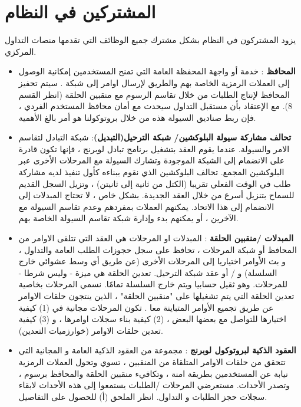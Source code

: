 \documentclass[12pt, a4paper, leqno]{report}
\theoremstyle{plain}
\theoremstyle{definition}
\begin{document}
\chapter{المشتركين في النظام}
\begin{multicols}{2}
\begin{otherlanguage}{arabic}
يزود المشتركون في النظام بشكل مشترك جميع الوظائف التي تقدمها منصات التداول  المركزي.

\begin{itemize}
  \item \textbf{المحافظ} : خدمة أو واجهة  المحفظة العامة التي تمنح المستخدمين إمكانية الوصول إلى العملات الرمزية الخاصة بهم والطريق لإرسال اوامر إلى شبكة  . سيتم تحفيز المحافظ لإنتاج الطلبات من خلال تقاسم الرسوم مع منقبين الحلقة (انظر القسم 8). مع الإعتقاد بأن مستقبل التداول سيحدث مع أمان محافظ المستخدم الفردي ، فإن ربط صناديق السيولة هذه من خلال بروتوكولنا هو أمر بالغ الأهمية.
  
  \item \textbf{تحالف مشاركة سيولة البلوكشين/ شبكة الترحيل(التبديل)}: شبكة التبادل لتقاسم الامر والسيولة. عندما يقوم العقد بتشغيل برنامج تبادل لوبرنج ، فإنها تكون قادرة على الانضمام إلى الشبكة الموجودة وتشارك السيولة مع المرحلات الأخرى عبر البلوكشين المجمع. تحالف البلوكشين الذي نقوم ببناءه كأول تنفيذ لديه مشاركة طلب في الوقت الفعلي تقريبا (الكتل من ثانية إلى ثانيتن) ، وتزيل السجل القديم للسماح بتنزيل أسرع من خلال العقد الجديدة. بشكل خاص ، لا تحتاج المبدلات إلى الانضمام إلى هذا الاتحاد. يمكنهم العملات بمفردهم وعدم تقاسم السيولة مع الآخرين ، أو يمكنهم بدء وإدارة شبكة تقاسم السيولة الخاصة بهم.
  
  \item \textbf{المبدلات /منقبين الحلقة } : المبدلات او المرحلات هي العقد التي تتلقى الاوامر من المحافظ أو شبكة المرحلات ، تحافظ على سجل حجوزات الطلب العامة والتداول ، و بث الأوامر اختياريا إلى المرحلات الأخرى (عن طريق أي وسط عشوائي خارج السلسلة) و / أو عقد شبكة الترحيل. تعدين الحلقة هي ميزة - وليس شرطا -  للمرحلات. وهو ثقيل حسابيا ويتم خارج السلسلة تمامًا. نسمي المرحلات بخاصية تعدين الحلقة التي يتم تشغيلها على "منقبين الحلقة" ، الذين ينتجون حلقات الاوامر عن طريق تجميع الأوامر المتباينة معا . تكون المرحلات مجانية في (1) كيفية اختيارها للتواصل مع بعضها البعض ، (2) كيفية بناء سجلات اوامرها ، و (3) كيفية تعدين حلقات الاوامر (خوارزميات التعدين).
  
  \item \textbf{العقود الذكية لبروتوكول لوبرنج } : مجموعة من العقود الذكية العامة و المجانية التي تتحقق من حلقات الاوامر المتلقاة من المنقبين ، تسوي وتحول العملات الرمزية نيابة عن المستخدمين بطريقة امنة ، وتكافيء منقبين الحلقة  والمحافظ برسوم ، وتصدر الأحداث. مستعرضي المرحلات /الطلبات يستمعوا إلى هذه الأحداث لابقاء سجلات حجز الطلبات و التداول. انظر الملحق (أ) للحصول على التفاصيل.


\end{itemize}
\end{otherlanguage}
\end{multicols}
\end{document}
